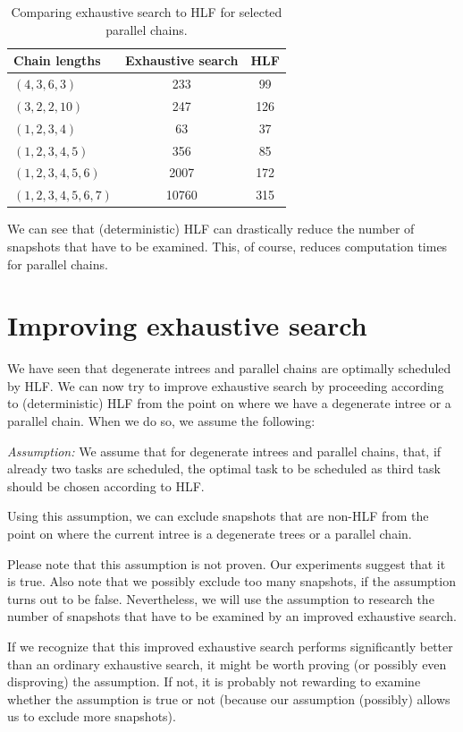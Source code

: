 \begin{table}[ht]
  \centering
  \begin{tabular}[ht]{lcc}
    Chain lengths & Exhaustive search & HLF \\
    \hline
    $(4,3,6,3)$ & 233 & 99 \\
    $(3,2,2,10)$ & 247 & 126 \\
    $(1,2,3,4)$ & 63 & 37 \\
    $(1,2,3,4,5)$ & 356 & 85 \\
    $(1,2,3,4,5,6)$ & 2007 & 172 \\
    $(1,2,3,4,5,6,7)$ & 10760 & 315
  \end{tabular}
  \caption{Comparing exhaustive search to HLF for selected parallel chains.}
  \label{tab:selected-parallel-chains-comparison}
\end{table}

We can see that (deterministic) HLF can drastically reduce the number of snapshots that have to be examined. This, of course, reduces computation times for parallel chains.

\section{Improving exhaustive search}
\label{sec:improving-exhaustive-search}

We have seen that degenerate intrees and parallel chains are optimally scheduled by HLF. We can now try to improve exhaustive search by proceeding according to (deterministic) HLF from the point on where we have a degenerate intree or a parallel chain. When we do so, we assume the following:

\emph{Assumption:} We assume that for degenerate intrees and parallel chains, that, if already two tasks are scheduled, the optimal task to be scheduled as third task should be chosen according to HLF.

Using this assumption, we can exclude snapshots that are non-HLF from the point on where the current intree is a degenerate trees or a parallel chain.

Please note that this assumption is not proven. Our experiments suggest that it is true. Also note that we possibly exclude too many snapshots, if the assumption turns out to be false. Nevertheless, we will use the assumption to research the number of snapshots that have to be examined by an improved exhaustive search. 

If we recognize that this improved exhaustive search performs significantly better than an ordinary exhaustive search, it might be worth proving (or possibly even disproving) the assumption. If not, it is probably not rewarding to examine whether the assumption is true or not (because our assumption (possibly) allows us to exclude more snapshots).

